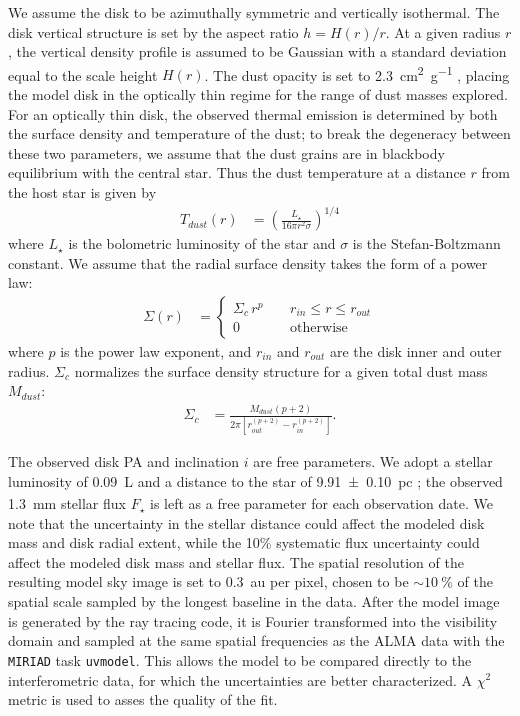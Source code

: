 \documentclass[12pt,oneside]{book}
\begin{document}
We assume the disk to be azimuthally symmetric and vertically isothermal. 
The disk vertical structure is set by the aspect ratio $h = H(r)/r$. 
At a given radius $r$, the vertical density profile is assumed to be Gaussian with a standard deviation equal to the scale height $H(r)$.
The dust opacity is set to \SI{2.3}{\cm^2.\gram^{-1}} \citep{beckwith90}, placing the model disk in the optically thin regime for the range of dust masses explored.
For an optically thin disk, the observed thermal emission is determined by both the surface density and temperature of the dust; to break the degeneracy between these two parameters, we assume that the dust grains are in blackbody equilibrium with the central star.
Thus the dust temperature at a distance $r$ from the host star is given by
\begin{align}
  T_{dust} (r) &= \left( \frac{L_{\star}}{16 \pi r^2 \sigma} \right)^{1/4}
\end{align}
where $L_{\star}$ is the bolometric luminosity of the star and $\sigma$ is the Stefan-Boltzmann constant. We assume that the radial surface density takes the form of a power law: 
\begin{align}
  \Sigma(r) &= 
  \begin{cases}
    \Sigma_c \, r^{p} \; \; \; \; & r_{in} \leq r \leq r_{out} \\
    0 \; \; \; \; &\mbox{otherwise} 
  \end{cases}
\end{align}
where $p$ is the power law exponent, and $r_{in}$ and $r_{out}$ are the disk inner and outer radius. 
$\Sigma_c$ normalizes the surface density structure for a given total dust mass $M_{dust}$:
\begin{align}
\Sigma_c &= \frac{M_{dust} \left(p + 2 \right)}{2 \pi \left[ r_{out}^{(p+2)} - r_{in}^{(p+2)} \right]}.
\end{align}

The observed disk PA and inclination $i$ are free parameters.
We adopt a stellar luminosity of \SI{0.09}{L_\sun} \citep{plavchan09} and a distance to the star of \SI{9.91 \pm 0.10}{pc} \citep{vanleeuwen07}; the observed \SI{1.3}{mm} stellar flux $F_\star$ is left as a free parameter for each observation date.
We note that the uncertainty in the stellar distance could affect the modeled disk mass and disk radial extent, while the 10\% systematic flux uncertainty could affect the modeled disk mass and stellar flux.
The spatial resolution of the resulting model sky image is set to \SI{0.3}{au} per pixel, chosen to be $\sim \SI{10}{\percent}$ of the spatial scale sampled by the longest baseline in the data. 
After the model image is generated by the ray tracing code, it is Fourier transformed into the visibility domain and sampled at the same spatial frequencies as the ALMA data with the \texttt{MIRIAD} task \texttt{uvmodel}.
This allows the model to be compared directly to the interferometric data, for which the uncertainties are better characterized.
A $\chi^2$ metric is used to asses the quality of the fit.
\end{document}
